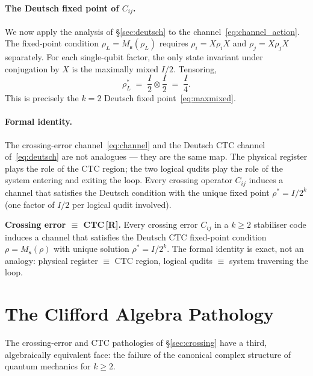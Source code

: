 \documentclass[11pt,a4paper]{article}
\newcommand{\Rmark}{\textcolor{green!50!black}{\textbf{[R]}}}
\newcommand{\Ms}{M_{\mathbf{s}}}
\begin{document}
\paragraph{The Deutsch fixed point of $C_{ij}$.}
We now apply the analysis of \S\ref{sec:deutsch} to the channel~\eqref{eq:channel_action}. The fixed-point condition $\rho_L=\Ms(\rho_L)$ requires $\rho_i=X\rho_i X$ and $\rho_j=X\rho_j X$ separately. For each single-qubit factor, the only state invariant under conjugation by $X$ is the maximally mixed $I/2$. Tensoring,
\begin{equation}
  \rho_L^* \;=\; \frac{I}{2}\otimes\frac{I}{2} \;=\; \frac{I}{4}.
  \label{eq:rho_L_star}
\end{equation}
This is precisely the $k=2$ Deutsch fixed point~\eqref{eq:maxmixed}.

\paragraph{Formal identity.}
The crossing-error channel~\eqref{eq:channel} and the Deutsch CTC channel of~\eqref{eq:deutsch} are not analogues --- they are the same map. The physical register plays the role of the CTC region; the two logical qudits play the role of the system entering and exiting the loop. Every crossing operator $C_{ij}$ induces a channel that satisfies the Deutsch condition with the unique fixed point $\rho^*=I/2^k$ (one factor of $I/2$ per logical qudit involved).

\begin{mdframed}[backgroundcolor=Rbg,linecolor=Rcolor,linewidth=1.5pt]
\textbf{Crossing error $\equiv$ CTC\,\Rmark.}\quad
Every crossing error $C_{ij}$ in a $k\geq2$ stabiliser code induces a channel that satisfies the Deutsch CTC fixed-point condition $\rho=\Ms(\rho)$ with unique solution $\rho^*=I/2^k$. The formal identity is exact, not an analogy: physical register $\equiv$ CTC region, logical qudits $\equiv$ system traversing the loop.
\end{mdframed}

\section{The Clifford Algebra Pathology}
\label{sec:clifford}

The crossing-error and CTC pathologies of \S\ref{sec:crossing} have a third, algebraically equivalent face: the failure of the canonical complex structure of quantum mechanics for $k\geq2$.
\end{document}
